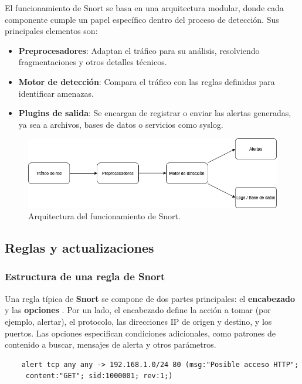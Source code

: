 \documentclass[11pt,a4paper,twoside]{report}
\begin{document}
El funcionamiento de Snort se basa en una arquitectura modular, donde cada componente cumple un papel específico dentro del proceso de detección. Sus principales elementos son:

\begin{itemize}
	\item \textbf{Preprocesadores}: Adaptan el tráfico para su análisis, resolviendo fragmentaciones y otros detalles técnicos.
	\item \textbf{Motor de detección}: Compara el tráfico con las reglas definidas para identificar amenazas.
	\item \textbf{Plugins de salida}: Se encargan de registrar o enviar las alertas generadas, ya sea a archivos, bases de datos o servicios como syslog.
\end{itemize}

\begin{figure}[H]
	\centering
	\includegraphics[scale=0.5]{adicional/diagrama_arquitectura.png}
	\caption{Arquitectura del funcionamiento de Snort.}
\end{figure}

\subsection{Reglas y actualizaciones}

\subsubsection{Estructura de una regla de Snort}

Una regla típica de \textbf{Snort} se compone de dos partes principales: el \textbf{encabezado} y las \textbf{opciones} \cite{snort3_rules_docs}. Por un lado, el encabezado define la acción a tomar (por ejemplo, alertar), el protocolo, las direcciones IP de origen y destino, y los puertos. Las opciones especifican condiciones adicionales, como patrones de contenido a buscar, mensajes de alerta y otros parámetros.

\begin{verbatim}
	alert tcp any any -> 192.168.1.0/24 80 (msg:"Posible acceso HTTP";
	 content:"GET"; sid:1000001; rev:1;)
\end{verbatim}
\end{document}

